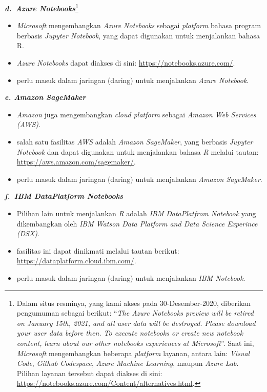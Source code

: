 \documentclass[
  12pt,
  a4paper,
]{scrbook}
\providecommand{\tightlist}{%
  \setlength{\itemsep}{0pt}\setlength{\parskip}{0pt}}
\begin{document}
\textbf{\emph{d.~Azure Notebooks}}\footnote{Dalam situs resminya, yang
  kami akses pada 30-Desember-2020, diberikan pengumuman sebagai
  berikut: ``\emph{The Azure Notebooks preview will be retired on
  January 15th, 2021, and all user data will be destroyed. Please
  download your user data before then. To execute notebooks or create
  new notebook content, learn about our other notebooks experiences at
  Microsoft}''. Saat ini, \emph{Microsoft} mengembangkan beberapa
  \emph{platform} layanan, antara lain: \emph{Visual Code}, \emph{Github
  Codespace}, \emph{Azure Machine Learning}, maupun \emph{Azure Lab}.
  Pilihan layanan tersebut dapat diakses di sini:
  \url{https://notebooks.azure.com/Content/alternatives.html}.}

\begin{itemize}
\tightlist
\item
  \emph{Microsoft} mengembangkan \emph{Azure Notebooks} sebagai
  \emph{platform} bahasa program berbasis \emph{Jupyter Notebook}, yang
  dapat digunakan untuk menjalankan bahasa R.
\item
  \emph{Azure Notebooks} dapat diakses di sini:
  \url{https://notebooks.azure.com/}.
\item
  perlu masuk dalam jaringan (daring) untuk menjalankan \emph{Azure
  Notebook}.
\end{itemize}

\textbf{\emph{e. Amazon SageMaker}}

\begin{itemize}
\tightlist
\item
  \emph{Amazon} juga mengembangkan \emph{cloud platform} sebagai
  \emph{Amazon Web Services (AWS)}.
\item
  salah satu fasilitas \emph{AWS} adalah \emph{Amazon SageMaker}, yang
  berbasis \emph{Jupyter Notebook} dan dapat digunakan untuk menjalankan
  bahasa \emph{R} melalui tautan:
  \url{https://aws.amazon.com/sagemaker/}.
\item
  perlu masuk dalam jaringan (daring) untuk menjalankan \emph{Amazon
  SageMaker}.
\end{itemize}

\textbf{\emph{f.~IBM DataPlatform Notebooks}}

\begin{itemize}
\tightlist
\item
  Pilihan lain untuk menjalankan \emph{R} adalah \emph{IBM DataPlatfrom
  Notebook} yang dikembangkan oleh \emph{IBM Watson Data Platform and
  Data Science Experince (DSX)}.
\item
  fasilitas ini dapat dinikmati melalui tautan berikut:
  \url{https://dataplatform.cloud.ibm.com/}.
\item
  perlu masuk dalam jaringan (daring) untuk menjalankan \emph{IBM
  Notebook}.
\end{itemize}
\end{document}
